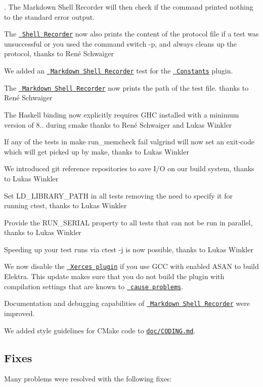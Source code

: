 . The Markdown Shell Recorder will then check if the command printed nothing to the standard error output.


\begin{DoxyItemize}
\item The \href{https://master.libelektra.org/tests/shell/shell_recorder}{\texttt{ Shell Recorder}} now also prints the content of the protocol file if a test was unsuccessful or you used the command switch {\ttfamily -\/p}, and always cleans up the protocol, thanks to René Schwaiger
\item We added an \href{https://master.libelektra.org/tests/shell/shell_recorder/tutorial_wrapper}{\texttt{ Markdown Shell Recorder}} test for the \href{http://libelektra.org/plugins/constants}{\texttt{ Constants}} plugin.
\item The \href{https://master.libelektra.org/tests/shell/shell_recorder/tutorial_wrapper}{\texttt{ Markdown Shell Recorder}} now prints the path of the test file. thanks to René Schwaiger
\item The Haskell binding now explicitly requires G\+HC installed with a minimum version of 8.. during cmake thanks to René Schwaiger and Lukas Winkler
\item If any of the tests in {\ttfamily make run\+\_\+memcheck} fail valgrind will now set an exit-\/code which will get picked up by make, thanks to Lukas Winkler
\item We introduced git reference repositories to save I/O on our build system, thanks to Lukas Winkler
\item Set {\ttfamily L\+D\+\_\+\+L\+I\+B\+R\+A\+R\+Y\+\_\+\+P\+A\+TH} in all tests removing the need to specify it for running ctest, thanks to Lukas Winkler
\item Provide the {\ttfamily R\+U\+N\+\_\+\+S\+E\+R\+I\+AL} property to all tests that can not be run in parallel, thanks to Lukas Winkler
\item Speeding up your test runs via {\ttfamily ctest -\/j} is now possible, thanks to Lukas Winkler
\item We now disable the \href{http://libelektra.org/plugins/xerces}{\texttt{ Xerces plugin}} if you use G\+CC with enabled A\+S\+AN to build Elektra. This update makes sure that you do not build the plugin with compilation settings that are known to \href{https://github.com/ElektraInitiative/libelektra/issues/1895}{\texttt{ cause problems}}.
\item Documentation and debugging capabilities of \href{https://master.libelektra.org/tests/shell/shell_recorder/tutorial_wrapper}{\texttt{ Markdown Shell Recorder}} were improved.
\item We added style guidelines for C\+Make code to \href{https://github.com/ElektraInitiative/libelektra/blob/master/doc/CODING.md\#cmake-guidelines}{\texttt{ {\ttfamily doc/\+C\+O\+D\+I\+N\+G.\+md}}}.
\end{DoxyItemize}\hypertarget{doc_news_2018-05-13_0_8_23_md_autotoc_md2208}{}\subsection{Fixes}\label{doc_news_2018-05-13_0_8_23_md_autotoc_md2208}
Many problems were resolved with the following fixes\+:


